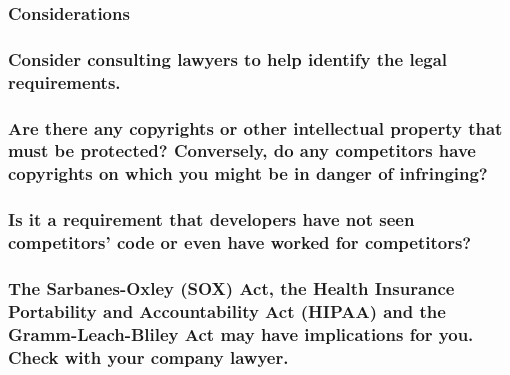 \documentclass[
]{article}
\begin{document}
\hypertarget{considerations-42}{%
\subsubsection{Considerations}\label{considerations-42}}

\hypertarget{consider-consulting-lawyers-to-help-identify-the-legal-requirements.}{%
\subsubsection{Consider consulting lawyers to help identify the legal
requirements.}\label{consider-consulting-lawyers-to-help-identify-the-legal-requirements.}}

\hypertarget{are-there-any-copyrights-or-other-intellectual-property-that-must-be-protected-conversely-do-any-competitors-have-copyrights-on-which-you-might-be-in-danger-of-infringing}{%
\subsubsection{\texorpdfstring{Are there any copyrights or other
intellectual property that must be protected? Conversely, do any
competitors have copyrights on which you might be in danger of
infringing?
}{Are there any copyrights or other intellectual property that must be protected? Conversely, do any competitors have copyrights on which you might be in danger of infringing? }}\label{are-there-any-copyrights-or-other-intellectual-property-that-must-be-protected-conversely-do-any-competitors-have-copyrights-on-which-you-might-be-in-danger-of-infringing}}

\hypertarget{is-it-a-requirement-that-developers-have-not-seen-competitors-code-or-even-have-worked-for-competitors}{%
\subsubsection{Is it a requirement that developers have not seen
competitors' code or even have worked for
competitors?}\label{is-it-a-requirement-that-developers-have-not-seen-competitors-code-or-even-have-worked-for-competitors}}

\hypertarget{the-sarbanes-oxley-sox-act-the-health-insurance-portability-and-accountability-act-hipaa-and-the-gramm-leach-bliley-act-may-have-implications-for-you.-check-with-your-company-lawyer.}{%
\subsubsection{\texorpdfstring{The Sarbanes-Oxley (SOX) Act, the Health
Insurance Portability and Accountability Act (HIPAA) and the
Gramm-Leach-Bliley Act may have implications for you. Check with your
company lawyer.
}{The Sarbanes-Oxley (SOX) Act, the Health Insurance Portability and Accountability Act (HIPAA) and the Gramm-Leach-Bliley Act may have implications for you. Check with your company lawyer. }}\label{the-sarbanes-oxley-sox-act-the-health-insurance-portability-and-accountability-act-hipaa-and-the-gramm-leach-bliley-act-may-have-implications-for-you.-check-with-your-company-lawyer.}}
\end{document}
